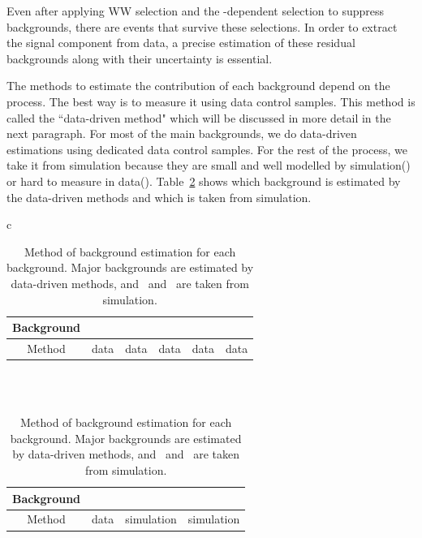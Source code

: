 Even after applying WW selection and the \mHi-dependent selection to suppress 
backgrounds, there are events that survive these selections. In order to extract 
the signal component from data, a precise estimation of these residual backgrounds 
along with their uncertainty is essential. 

The methods to estimate the contribution of each background depend on the process. 
The best way is to measure it using data control samples. This method is 
called the ``data-driven method" which will be discussed in more detail in the next paragraph. 
For most of the main backgrounds, we do data-driven estimations using dedicated
data control samples. For the rest of the process, we take it from simulation
because they are small and well modelled by simulation(\vv) or hard to measure in data(\wgamma). 
Table~\ref{tab:overview_bkgest} shows which background is estimated by the
data-driven methods and which is taken from simulation. 

%
\begin{table}[htp] 
\begin{center} 
\vspace{0.5cm}
\caption{Method of background estimation for each background. Major backgrounds 
are estimated by data-driven methods, and \wgamma\ and  \vv\ are taken 
from simulation.} 
\vspace{0.5cm}
\begin{tabular}{c}   

    \begin{tabular}{c|c|c|c|c|c}   
    \hline 
    Background     & \qqww & \topbkg & \dyll & \Wjets & \wgammastar  \\
    \hline 
    \hline 
    Method         & data & data & data & data & data \\ 
    \hline 
    \end{tabular} 
    \\
    \\
    \begin{tabular}{c|c|c|c}   
    \hline 
    Background     & \ggww & \wgamma & \vv \\
    \hline 
    \hline 
    Method         & data & simulation & simulation \\ 
    \hline 
    \end{tabular} 

\end{tabular} 
\label{tab:overview_bkgest} 
\end{center} 
\end{table} 

